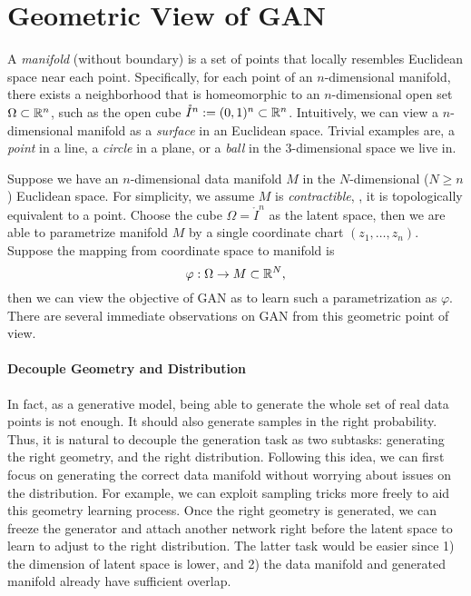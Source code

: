 \section{Geometric View of GAN} \label{sec:geom}

A \emph{manifold} (without boundary) is a set of points that
locally resembles Euclidean space near each point.
Specifically,
for each point of an $n$-dimensional manifold,
there exists a neighborhood that is homeomorphic to an $n$-dimensional open
set $\Omega\subset{\mathbb{R}}^n$,
such as the open cube $\mathring{I}^n:=(0,1)^n\subset{\mathbb{R}}^n$.
Intuitively,
we can view a $n$-dimensional manifold as a \emph{surface}
in an Euclidean space.
Trivial examples are,
a \emph{point} in a line,
a \emph{circle} in a plane,
or a \emph{ball} in the $3$-dimensional space we live in.

Suppose we have an $n$-dimensional data manifold $M$ in the $N$-dimensional
($N\ge n$) Euclidean space.
For simplicity,
we assume $M$ is \emph{contractible},
\ie,
it is topologically equivalent to a point.
Choose the cube $\Omega=\mathring{I}^n$ as the latent space,
then we are able to parametrize manifold $M$ by a
single coordinate chart $(z_1,\dots,z_n)$.
Suppose the mapping from coordinate space to manifold is
\begin{equation}
    \varphi:\Omega\to M\subset {\mathbb{R}}^N,
\end{equation}
then we can view the objective of GAN as to learn such a
parametrization as $\varphi$.
There are several immediate observations on GAN from this geometric
point of view.

\paragraph{Decouple Geometry and Distribution}
In fact,
as a generative model,
being able to generate the whole set of real data points is not enough.
It should also generate samples in the right probability.
Thus,
it is natural to decouple the generation task as two subtasks:
generating the right geometry,
and the right distribution.
Following this idea,
we can first focus on generating the correct data manifold
without worrying about issues on the distribution.
For example,
we can exploit sampling tricks more freely to aid
this geometry learning process.
Once the right geometry is generated,
we can freeze the generator and attach another network
right before the latent space
to learn to adjust to the right distribution.
The latter task would be easier since
1) the dimension of latent space is lower,
and
2) the data manifold and generated manifold already have sufficient overlap.

